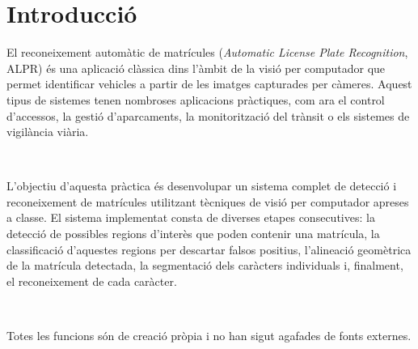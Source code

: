 
\section{Introducció}

El reconeixement automàtic de matrícules (\textit{Automatic License Plate Recognition}, ALPR) és una aplicació clàssica dins l'àmbit de la visió per computador que permet identificar vehicles a partir de les imatges capturades per càmeres. Aquest tipus de sistemes tenen nombroses aplicacions pràctiques, com ara el control d'accessos, la gestió d'aparcaments, la monitorització del trànsit o els sistemes de vigilància viària.

\

L'objectiu d'aquesta pràctica és desenvolupar un sistema complet de detecció i reconeixement de matrícules utilitzant tècniques de visió per computador apreses a classe. El sistema implementat consta de diverses etapes consecutives: la detecció de possibles regions d'interès que poden contenir una matrícula, la classificació d'aquestes regions per descartar falsos positius, l'alineació geomètrica de la matrícula detectada, la segmentació dels caràcters individuals i, finalment, el reconeixement de cada caràcter.

\

Totes les funcions són de creació pròpia i no han sigut agafades de fonts externes. 

